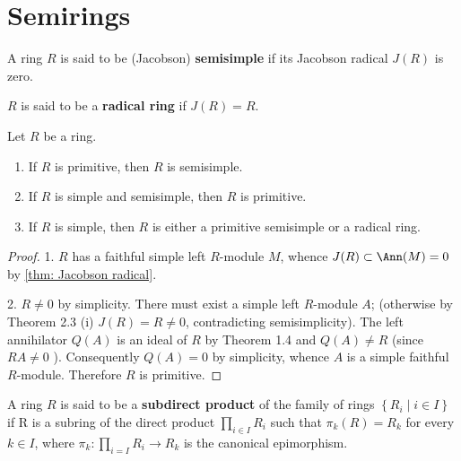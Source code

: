 \section{Semirings} %



\begin{definition}
    A ring $R$ is said to be (Jacobson) \textbf{semisimple} if its Jacobson radical $J(R)$ is zero.

    $R$ is said to be a \textbf{radical ring }if $J(R)=R$.
\end{definition}



\begin{theorem}
    Let $R$ be a ring.
    \begin{enumerate}
        \item
              If $R$ is primitive, then $R$ is semisimple.
        \item
              If $R$ is simple and semisimple, then $R$ is primitive.
        \item
              If $R$ is simple, then $R$ is either a primitive semisimple or a radical ring.
    \end{enumerate}
    \begin{proof}
        1.
        $R$ has a faithful simple left $R$-module $M$, whence $J(R) \subset \Ann(M)=0$ by \ref{thm: Jacobson radical}.

        2.
        $R \neq 0$ by simplicity. There must exist a simple left $R$-module $A$; (otherwise by Theorem 2.3 (i) $J(R)=R \neq 0$, contradicting semisimplicity). The left annihilator $Q(A)$ is an ideal of $R$ by Theorem 1.4 and $Q(A) \neq R$ (since $R A \neq 0$ ). Consequently $Q(A)=0$ by simplicity, whence $A$ is a simple faithful $R$-module. Therefore $R$ is primitive.
    \end{proof}
\end{theorem}



\begin{definition}
    A ring $R$ is said to be a \textbf{subdirect product} of the family of rings $\left\{R_{i} \mid i \in I\right\}$ if R is a subring of the direct product $\prod_{i \in I} R_{i}$ such that $\pi_{k}(R)=R_{k}$ for every $k \in I$, where $\pi_{k}: \prod_{i=I} R_{i} \rightarrow R_{k}$ is the canonical epimorphism.
\end{definition}


